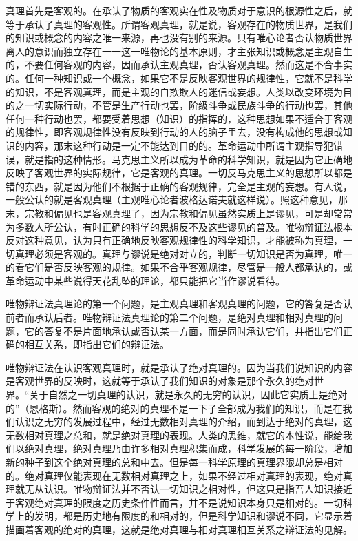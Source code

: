 真理首先是客观的。在承认了物质的客观实在性及物质对于意识的根源性之后，就等于承认了真理的客观性。所谓客观真理，就是说，客观存在的物质世界，是我们的知识或概念的内容之唯一来源，再也没有别的来源。只有唯心论者否认物质世界离人的意识而独立存在一一这一唯物论的基本原则，才主张知识或概念是主观自生的，不要任何客观的内容，因而承认主观真理，否认客观真理。然而这是不合事实的。任何一种知识或一个概念，如果它不是反映客观世界的规律性，它就不是科学的知识，不是客观真理，而是主观的自欺欺人的迷信或妄想。人类以改变环境为目的之一切实际行动，不管是生产行动也罢，阶级斗争或民族斗争的行动也罢，其他任何一种行动也罢，都要受着思想（知识）的指挥的，这种思想如果不适合于客观的规律性，即客观规律性没有反映到行动的人的脑子里去，没有构成他的思想或知识的内容，那末这种行动是一定不能达到目的的。革命运动中所谓主观指导犯错误，就是指的这种情形。马克思主义所以成为革命的科学知识，就是因为它正确地反映了客观世界的实际规律，它是客观的真理。一切反马克思主义的思想所以都是错的东西，就是因为他们不根据于正确的客观规律，完全是主观的妄想。有人说，一般公认的就是客观真理（主观唯心论者波格达诺夫就这样说）。照这种意见，那末，宗教和偏见也是客观真理了，因为宗教和偏见虽然实质上是谬见，可是却常常为多数人所公认，有时正确的科学的思想反不及这些谬见的普及。唯物辩证法根本反对这种意见，认为只有正确地反映客观规律性的科学知识，才能被称为真理，一切真理必须是客观的。真理与谬说是绝对对立的，判断一切知识是否为真理，唯一的看它们是否反映客观的规律。如果不合乎客观规律，尽管是一般人都承认的，或革命运动中某些说得天花乱坠的理论，都只能把它当作谬说看待。

唯物辩证法真理论的第一个问题，是主观真理和客观真理的问题，它的答复是否认前者而承认后者。唯物辩证法真理论的第二个问题，是绝对真理和相对真理的问题，它的答复不是片面地承认或否认某一方面，而是同时承认它们，并指出它们正确的相互关系，即指出它们的辩证法。

唯物辩证法在认识客观真理时，就是承认了绝对真理的。因为当我们说知识的内容是客观世界的反映时，这就等于承认了我们知识的对象是那个永久的绝对世界。“关于自然之一切真理的认识，就是永久的无穷的认识，因此它实质上是绝对的”（恩格斯）。然而客观的绝对的真理不是一下子全部成为我们的知识，而是在我们认识之无穷的发展过程中，经过无数相对真理的介绍，而到达于绝对的真理，这无数相对真理之总和，就是绝对真理的表现。人类的思维，就它的本性说，能给我们以绝对真理，绝对真理乃由许多相对真理积集而成，科学发展的每一阶段，增加新的种子到这个绝对真理的总和中去。但是每一科学原理的真理界限却总是相对的。绝对真理仅能表现在无数相对真理之上，如果不经过相对真理的表现，绝对真理就无从认识。唯物辩证法并不否认一切知识之相对性，但这只是指吾人知识接近于客观绝对真理的限度之历史条件性而言，并不是说知识本身只是相对的。一切科学上的发明，都是历史地有限度的和相对的，但是科学知识和谬说不同，它显示着描画着客观的绝对的真理，这就是绝对真理与相对真理相互关系之辩证法的见解。

